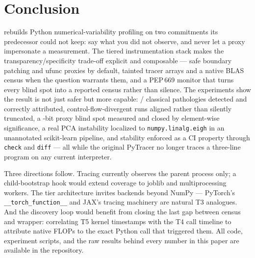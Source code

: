 \section{Conclusion}
\label{sec:conclusion}

\pyt{} rebuilds Python numerical-variability profiling on two commitments
its predecessor could not keep: say what you did not observe, and never
let a proxy impersonate a measurement. The tiered instrumentation stack
makes the transparency/specificity trade-off explicit and composable ---
safe boundary patching and ufunc proxies by default, tainted tracer
arrays and a native BLAS census when the question warrants them, and a
PEP\,669 monitor that turns every blind spot into a reported census
rather than silence. The experiments show the result is not just safer
but more capable: \nDetected{}/\nPathologies{} classical pathologies
detected and correctly attributed, control-flow-divergent runs aligned
rather than silently truncated, a \permOptimismBits{}-bit proxy blind
spot measured and closed by element-wise significance, a real PCA
instability localized to \texttt{numpy.linalg.eigh} in an unannotated
scikit-learn pipeline, and stability enforced as a CI property through
\texttt{check} and \texttt{diff} --- all while the original PyTracer no
longer traces a three-line program on any current interpreter.

Three directions follow. Tracing currently observes the parent process
only; a child-bootstrap hook would extend coverage to joblib and
multiprocessing workers. The tier architecture invites backends beyond
NumPy --- PyTorch's \texttt{\_\_torch\_function\_\_} and JAX's tracing
machinery are natural T3 analogues. And the discovery loop would benefit
from closing the last gap between census and wrapper: correlating T5
kernel timestamps with the T4 call timeline to attribute native FLOPs to
the exact Python call that triggered them. All code, experiment scripts,
and the raw results behind every number in this paper are available in
the \pyt{} repository.
